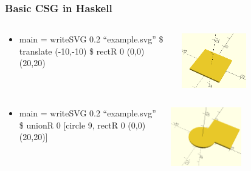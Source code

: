 \documentclass{beamer}
\begin{document}
\begin{frame}
\frametitle{Basic CSG in Haskell}
\begin{columns}
  \begin{column}{0.5\textwidth}
    \begin{itemize}
    \item main = writeSVG 0.2 ``example.svg'' \$ translate (-10,-10) \$ rectR 0 (0,0) (20,20)
    \end{itemize}
  \end{column}
  \begin{column}{0.5\textwidth}
    \includegraphics[width=0.5\textwidth, right]{openscad-translate_square_20.png}
  \end{column}
\end{columns}
\begin{columns}
  \begin{column}{0.5\textwidth}
    \begin{itemize}
    \item main = writeSVG 0.2 ``example.svg'' \$ unionR 0 [circle 9, rectR 0 (0,0) (20,20)]
    \end{itemize}
  \end{column}
  \begin{column}{0.5\textwidth}
    \includegraphics[width=0.5\textwidth, right]{openscad-union_circle_9_square_20.png}
  \end{column}
\end{columns}
\end{frame}
\end{document}
